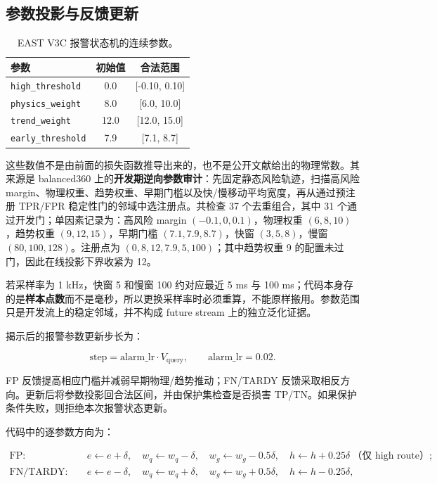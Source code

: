\documentclass[11pt,a4paper]{article}
\newcommand{\code}[1]{\texttt{\small #1}}
\begin{document}
\subsection{参数投影与反馈更新}

\begin{table}[H]
\centering
\caption{EAST V3C 报警状态机的连续参数。}
\begin{tabular}{l c c}
\toprule
参数 & 初始值 & 合法范围\\
\midrule
\code{high\_threshold} & 0.0 & [-0.10, 0.10]\\
\code{physics\_weight} & 8.0 & [6.0, 10.0]\\
\code{trend\_weight} & 12.0 & [12.0, 15.0]\\
\code{early\_threshold} & 7.9 & [7.1, 8.7]\\
\bottomrule
\end{tabular}
\end{table}

这些数值不是由前面的损失函数推导出来的，也不是公开文献给出的物理常数。其来源是 balanced360 上的\textbf{开发期逆向参数审计}：先固定静态风险轨迹，扫描高风险 margin、物理权重、趋势权重、早期门槛以及快/慢移动平均宽度，再从通过预注册 TPR/FPR 稳定性门的邻域中选注册点。共检查 37 个去重组合，其中 31 个通过开发门；单因素记录为：高风险 margin \((-0.1,0,0.1)\)，物理权重 \((6,8,10)\)，趋势权重 \((9,12,15)\)，早期门槛 \((7.1,7.9,8.7)\)，快窗 \((3,5,8)\)，慢窗 \((80,100,128)\)。注册点为 \((0,8,12,7.9,5,100)\)；其中趋势权重 9 的配置未过门，因此在线投影下界收紧为 12。

若采样率为 1 kHz，快窗 5 和慢窗 100 约对应最近 5 ms 与 100 ms；代码本身存的是\textbf{样本点数}而不是毫秒，所以更换采样率时必须重算，不能原样搬用。参数范围只是开发流上的稳定邻域，并不构成 future stream 上的独立泛化证据。

揭示后的报警参数更新步长为：

\begin{equation}
\mathrm{step}=\mathrm{alarm\_lr}\cdot V_{\mathrm{query}},
\qquad \mathrm{alarm\_lr}=0.02.
\label{eq:alarm-step}
\end{equation}

FP 反馈提高相应门槛并减弱早期物理/趋势推动；FN/TARDY 反馈采取相反方向。更新后将参数投影回合法区间，并由保护集检查是否损害 TP/TN。如果保护条件失败，则拒绝本次报警状态更新。

代码中的逐参数方向为：

\begin{align*}
\mathrm{FP}:&\quad e\leftarrow e+\delta,\quad
w_q\leftarrow w_q-\delta,\quad
w_g\leftarrow w_g-0.5\delta,\quad
h\leftarrow h+0.25\delta\ \text{（仅 high route）};\\
\mathrm{FN/TARDY}:&\quad e\leftarrow e-\delta,\quad
w_q\leftarrow w_q+\delta,\quad
w_g\leftarrow w_g+0.5\delta,\quad
h\leftarrow h-0.25\delta,
\end{align*}
\end{document}
